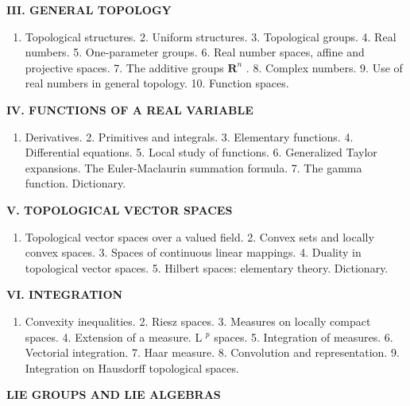 \textbf{III. GENERAL TOPOLOGY}\par

\begin{enumerate}
\def\labelenumi{\arabic{enumi}.}
\tightlist
\item
  Topological structures. 2. Uniform structures. 3. Topological groups. 4. Real numbers. 5. One-parameter groups. 6. Real number spaces, affine and projective spaces. 7. The additive groups \(\mathbf{R}^n\) . 8. Complex numbers. 9. Use of real numbers in general topology. 10. Function spaces.
\end{enumerate}

\textbf{IV. FUNCTIONS OF A REAL VARIABLE}\par

\begin{enumerate}
\def\labelenumi{\arabic{enumi}.}
\tightlist
\item
  Derivatives. 2. Primitives and integrals. 3. Elementary functions. 4. Differential equations. 5. Local study of functions. 6. Generalized Taylor expansions. The Euler-Maclaurin summation formula. 7. The gamma function. Dictionary.
\end{enumerate}

\textbf{V. TOPOLOGICAL VECTOR SPACES}\par

\begin{enumerate}
\def\labelenumi{\arabic{enumi}.}
\tightlist
\item
  Topological vector spaces over a valued field. 2. Convex sets and locally convex spaces. 3. Spaces of continuous linear mappings. 4. Duality in topological vector spaces. 5. Hilbert spaces: elementary theory. Dictionary.
\end{enumerate}

\textbf{VI. INTEGRATION}\par

\begin{enumerate}
\def\labelenumi{\arabic{enumi}.}
\tightlist
\item
  Convexity inequalities. 2. Riesz spaces. 3. Measures on locally compact spaces. 4. Extension of a measure. L \(^{p}\) spaces. 5. Integration of measures. 6. Vectorial integration. 7. Haar measure. 8. Convolution and representation. 9. Integration on Hausdorff topological spaces.
\end{enumerate}


\textbf{LIE GROUPS AND LIE ALGEBRAS}\par

